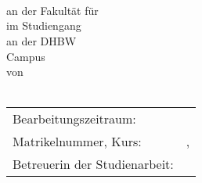 \begin{titlepage}
  \begin{minipage}{6in}
    \vspace*{-2cm}
    \centering
    \hspace{-2cm}
	\ifx\vFirmenlogoPfad\empty
	\else
  \fi
	\hfill
	\ifx\vDHBWLogoPfad\empty
	\else
	\fi
  \end{minipage}
  \begin{center}
    \vspace*{0.5cm}
    \Huge\textbf{\vTitel}\\
		\ifx\vUntertitel\empty
		\else
			\Large\rm\vUntertitel\\
		\fi
		\vspace*{2cm}
		\textbf{\vArbeitstyp}\\
		\normalsize
		\vspace*{1.3cm}
		an der Fakultät für \vFakultaet\\
		im Studiengang \vStudiengang\\
		\vspace*{1cm}
		an der \ac{DHBW} \vDHBWStandort\\
		\ifx\vDHBWCampus\empty
		\else
		Campus \vDHBWCampus\\
		\fi
		\vspace*{1cm}
		von\\
		\ifx\vAutor\empty
		\else
			\vAutor\\
		\fi
		\vspace*{2cm}
		\vfill
  
	  \begin{tabular}{ll}
	    Bearbeitungszeitraum:&\vBearbeitungszeitraum\\
	    Matrikelnummer, Kurs:&\vMatrikelnummer, \vKursKuerzel\\
		  Betreuerin der Studienarbeit:&\vBetreuer\\
	  \end{tabular}
	\end{center}
\end{titlepage}
\newpage
\setcounter{page}{2}